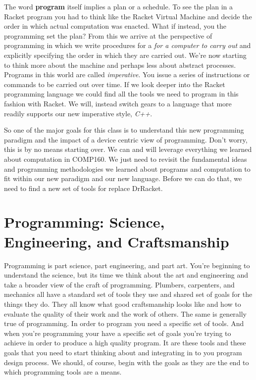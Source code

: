 \documentclass[]{tufte-handout}
\begin{document}
The word \textbf{program} itself implies a plan or a schedule. To see the plan in a Racket program you had to think like the Racket Virtual Machine and decide the order in which actual computation was enacted. What if instead, you the programming set the plan? From this we arrive at the perspective of programming in which we write procedures for a \textit{for a computer to carry out} and explicitly specifying the order in which they are carried out.  We're now starting to think more about the machine and perhaps less  about abstract processes.  Programs in this world are called \textit{imperative}.  You issue a series of instructions or commands to be carried out over time.  If we look deeper into the Racket programming language we could find all the tools we need to program in this fashion with Racket.  We will, instead switch gears to a language that more readily supports our new imperative style, \textit{C++}. 

So one of the major goals for this class is to understand this new programming paradigm and the impact of a device centric view of programming. Don't worry, this is by no means starting over.  We can and will leverage everything we learned about computation in COMP160. We just need to revisit the fundamental ideas and programming methodologies we learned about programs and computation to fit within our new paradigm and our new language. Before we can do that, we need to find a new set of tools for replace DrRacket.


\section{Programming: Science, Engineering, and Craftsmanship}

Programming is part science, part engineering, and part art.  You're beginning to understand the science, but its time we think about the art and engineering and take a broader view of the craft of programming.  Plumbers, carpenters, and mechanics all have a standard set of tools they use and shared set of goals for the things they do.  They all know what good craftsmanship looks like and how to evaluate the quality of their work and the work of others. The same is generally true of programming. In order to program you need a specific set of tools. And when you're programming your have a specific set of goals you're trying to achieve in order to produce a high quality program. It are these tools and these goals that you need to start thinking about and integrating in to you program design process.  We should, of course, begin with the goals as they are the end to which programming tools are a means.  
\end{document}
